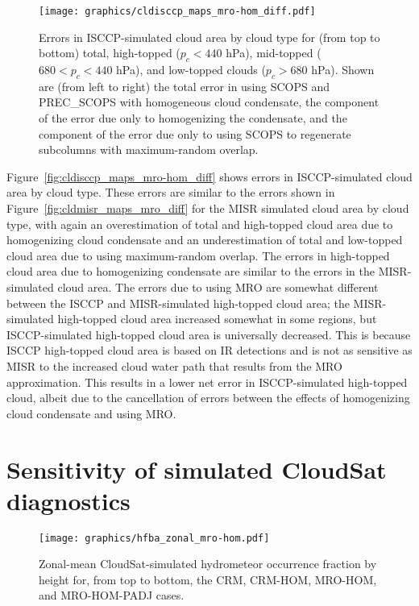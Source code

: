 \begin{figure}[tp]
\centering
\texttt{[image: graphics/cldisccp\_maps\_mro-hom\_diff.pdf]}
\caption{\label{fig:cldisccp_maps_mro-hom_diff}Errors in ISCCP-simulated
cloud area by cloud type for (from top to bottom) total, high-topped
(\(p_c < 440\) hPa), mid-topped (\(680 < p_c < 440\) hPa), and
low-topped clouds (\(p_c > 680\) hPa). Shown are (from left to right)
the total error in using SCOPS and PREC\_SCOPS with homogeneous cloud
condensate, the component of the error due only to homogenizing the
condensate, and the component of the error due only to using SCOPS to
regenerate subcolumns with maximum-random
overlap.}\label{fig:cldisccpux5fmapsux5fmro-homux5fdiff}
\end{figure}

Figure~\ref{fig:cldisccp_maps_mro-hom_diff} shows errors in
ISCCP-simulated cloud area by cloud type. These errors are similar to
the errors shown in Figure~\ref{fig:cldmisr_maps_mro_diff} for the MISR
simulated cloud area by cloud type, with again an overestimation of
total and high-topped cloud area due to homogenizing cloud condensate
and an underestimation of total and low-topped cloud area due to using
maximum-random overlap. The errors in high-topped cloud area due to
homogenizing condensate are similar to the errors in the MISR-simulated
cloud area. The errors due to using MRO are somewhat different between
the ISCCP and MISR-simulated high-topped cloud area; the MISR-simulated
high-topped cloud area increased somewhat in some regions, but
ISCCP-simulated high-topped cloud area is universally decreased. This is
because ISCCP high-topped cloud area is based on IR detections and is
not as sensitive as MISR to the increased cloud water path that results
from the MRO approximation. This results in a lower net error in
ISCCP-simulated high-topped cloud, albeit due to the cancellation of
errors between the effects of homogenizing cloud condensate and using
MRO.

\section{Sensitivity of simulated CloudSat
diagnostics}\label{sensitivity-of-simulated-cloudsat-diagnostics}

\begin{figure}[tp]
\centering
\texttt{[image: graphics/hfba\_zonal\_mro-hom.pdf]}
\caption{\label{fig:hfba_zonal_mro}Zonal-mean CloudSat-simulated
hydrometeor occurrence fraction by height for, from top to bottom, the
CRM, CRM-HOM, MRO-HOM, and MRO-HOM-PADJ
cases.}\label{fig:hfbaux5fzonalux5fmro}
\end{figure}

